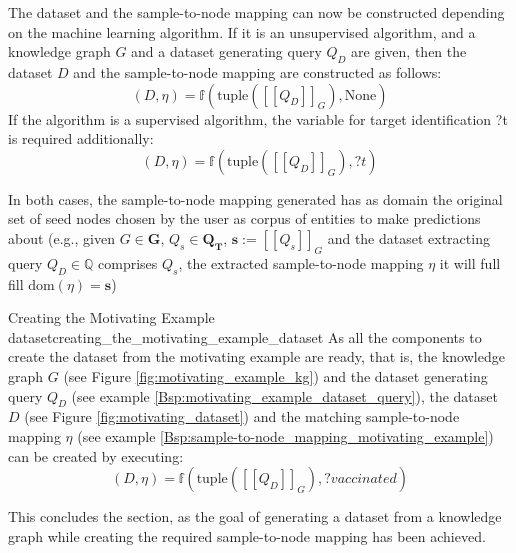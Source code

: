     The dataset and the sample-to-node mapping can now be constructed depending on the machine learning algorithm. If it is an unsupervised algorithm, and a knowledge graph $G$ and a dataset generating query $Q_D$ are given, then the dataset $D$ and the sample-to-node mapping are constructed as follows:
    \[(D, \eta) = \mathbb{f}(\text{tuple}([[Q_D]]_G), \text{None})\]
    If the algorithm is a supervised algorithm, the variable for target identification ?t is required additionally:
    \[(D, \eta) = \mathbb{f}(\text{tuple}([[Q_D]]_G), ?t)\]
    
    In both cases, the sample-to-node mapping generated has as domain the original set of seed nodes chosen by the user as corpus of entities to make predictions about (e.g., given $G \in \mathbf{G}$, $Q_s \in \mathbf{Q_T}$, $\mathbf{s} := [[Q_s]]_G$ and the dataset extracting query $Q_D \in \mathbb{Q}$ comprises $Q_s$, the extracted sample-to-node mapping $\eta$ it will full fill $\text{dom}(\eta) = \mathbf{s}$)
    
    \begin{Bsp}{Creating the Motivating Example dataset}{creating_the_motivating_example_dataset}
    As all the components to create the dataset from the motivating example are ready, that is, the knowledge graph $G$ (see Figure \ref{fig:motivating_example_kg}) and the dataset generating query $Q_D$ (see example \ref{Bsp:motivating_example_dataset_query}), the dataset $D$ (see Figure \ref{fig:motivating_dataset}) and the matching sample-to-node mapping $\eta$ (see example \ref{Bsp:sample-to-node_mapping_motivating_example}) can be created by executing:
    \[(D, \eta) = \mathbb{f}(\text{tuple}([[Q_D]]_G), ?vaccinated)\]
    \end{Bsp}
    This concludes the section, as the goal of generating a dataset from a knowledge graph while creating the required sample-to-node mapping has been achieved. 
